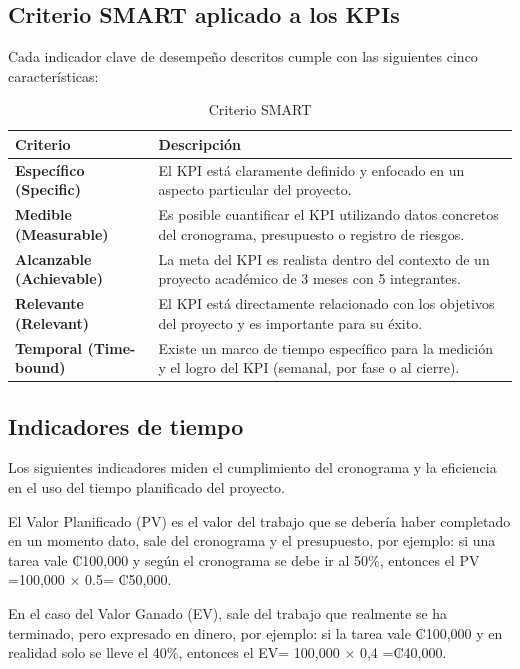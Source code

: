 \documentclass[11pt,spanish]{article}
\begin{document}
\subsection{Criterio SMART aplicado a los KPIs}

Cada indicador clave de desempeño descritos cumple con las siguientes cinco características:

\begin{table}[H]
\centering
\small
\caption{Criterio SMART}\label{tab:criterio-smart}
\begin{tabularx}{\textwidth}{p{4.5cm} Y}
\toprule
\textbf{Criterio} & \textbf{Descripción} \\
\midrule
\textbf{Específico (Specific)} & El KPI está claramente definido y enfocado en un aspecto particular del proyecto. \\
\textbf{Medible (Measurable)} & Es posible cuantificar el KPI utilizando datos concretos del cronograma, presupuesto o registro de riesgos. \\
\textbf{Alcanzable (Achievable)} & La meta del KPI es realista dentro del contexto de un proyecto académico de 3 meses con 5 integrantes. \\
\textbf{Relevante (Relevant)} & El KPI está directamente relacionado con los objetivos del proyecto y es importante para su éxito. \\
\textbf{Temporal (Time-bound)} & Existe un marco de tiempo específico para la medición y el logro del KPI (semanal, por fase o al cierre). \\
\bottomrule
\end{tabularx}
\end{table}

\subsection{Indicadores de tiempo}

Los siguientes indicadores miden el cumplimiento del cronograma y la eficiencia en el uso del tiempo planificado del proyecto.

El Valor Planificado (PV) es el valor del trabajo que se debería haber completado en un momento dato, sale del cronograma y el presupuesto, por ejemplo: si una tarea vale ₡100,000 y según el cronograma se debe ir al 50\%, entonces el PV =100,000 $\times$ 0.5= ₡50,000.

En el caso del Valor Ganado (EV), sale del trabajo que realmente se ha terminado, pero expresado en dinero, por ejemplo: si la tarea vale ₡100,000 y en realidad solo se lleve el 40\%, entonces el EV= 100,000 $\times$ 0,4 =₡40,000.
\end{document}
